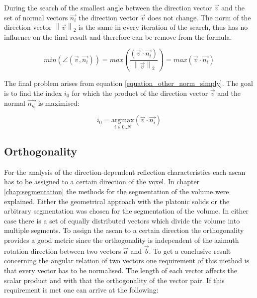 During the search of the smallest angle between the direction vector $\overrightarrow{v}$ and the set of normal vectors $\overrightarrow{n_i}$ the direction vector $\overrightarrow{v}$ does not change. 
The norm of the direction vector $\left \| \overrightarrow{v} \right \|_2$ is the same in every iteration of the search, thus has no influence on the final result and therefore can be remove from the formula.

\begin{equation}
min \left (  \angle (\overrightarrow{v},\overrightarrow{n_i}) \right ) = 
max \left (    \frac{(\overrightarrow{v} \cdot \overrightarrow{n_i})}{\left \| \overrightarrow{v} \right \|_2  }  \right ) = max \left (    \overrightarrow{v} \cdot \overrightarrow{n_i}  \right ) 
\label{equation_other_norm_simply}
\end{equation}

The final problem arises from equation \ref{equation_other_norm_simply}. The goal is to find the index $i_0$ for which the product of the direction vector $\overrightarrow{v}$ and the normal $\overrightarrow{n_{i_0}}$ is maximised: 

\begin{equation}
i_0 = \underset{i \in 0..N}{\mathrm{argmax}} \left (    \overrightarrow{v} \cdot \overrightarrow{n_i}  \right )
\label{equation_arg_max}
\end{equation}



\subsection{Orthogonality}
For the analysis of the direction-dependent reflection characteristics each \ac{ascan} has to be assigned to a certain direction of the voxel.
In chapter \ref{chap:segmentation} the methods for the segmentation of the volume were explained. Either the geometrical approach with the platonic solids or the arbitrary segmentation was chosen for the segmentation of the volume. In either case there is a set of equally distributed vectors which divide the volume into multiple segments. To assign the \ac{ascan} to a certain direction the orthogonality provides a good metric since the orthogonality is independent of the azimuth rotation direction between two vectors $\overrightarrow{a}$ and $ \overrightarrow{b}$. 
To get a conclusive result concerning the angular relation of two vectors one requirement of this method is that every vector has to be normalised. The length of each vector affects the scalar product and with that the orthogonality of the vector pair.
If this requirement is met one can arrive at the following:

